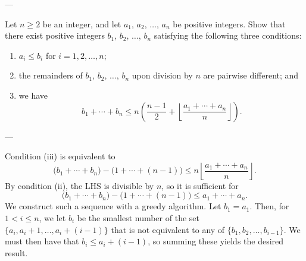 
---

Let $n\ge 2$ be an integer, and let $a_1$, $a_2$, $\ldots$, $a_n$ be positive integers. Show that there exist positive integers $b_1$, $b_2$, $\ldots$, $b_n$ satisfying the following three conditions:
\begin{enumerate}[label=(\roman*)]
\item $a_i\le b_i$ for $i=1,2,\ldots,n$;
\item the remainders of $b_1$, $b_2$, $\ldots$, $b_n$ upon division by $n$ are pairwise different; and
\item we have \[b_1+\cdots+b_n\le n\left(\frac{n-1}2+\left\lfloor\frac{a_1+\cdots+a_n}n\right\rfloor\right).\]
\end{enumerate}

---

Condition (iii) is equivalent to \[\big(b_1+\cdots+b_n\big)-\big(1+\cdots+(n-1)\big)\le n\left\lfloor\frac{a_1+\cdots+a_n}n\right\rfloor.\]
By condition (ii), the LHS is divisible by $n$, so it is sufficient for \[\big(b_1+\cdots+b_n\big)-\big(1+\cdots+(n-1)\big)\le a_1+\cdots+a_n.\]
We construct such a sequence with a greedy algorithm. Let $b_1=a_1$. Then, for $1<i\le n$, we let $b_i$ be the smallest number of the set $\{a_i,a_i+1,\ldots,a_i+(i-1)\}$ that is not equivalent to any of $\{b_1,b_2,\ldots,b_{i-1}\}$. We must then have that $b_i\le a_i+(i-1)$, so summing these yields the desired result.

